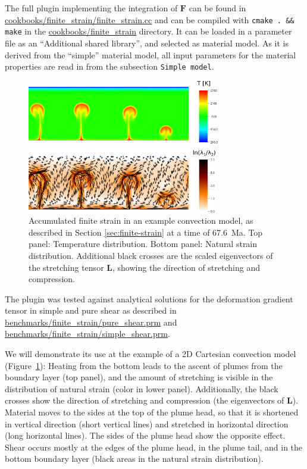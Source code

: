 \documentclass{article}
\begin{document}
The full plugin implementing the integration of $\mathbf F$ can be found in \url{cookbooks/finite_strain/finite_strain.cc} and can be compiled 
with \texttt{cmake . \&\& make} in the \url{cookbooks/finite_strain} directory. 
It can be loaded in a parameter file as an ``Additional shared library'', and selected as material
model. As it is derived from the ``simple'' material model, all input parameters for the material
properties are read in from the subsection \texttt{Simple model}. 


\begin{figure}
    \centering
    \includegraphics[width=0.75\textwidth]{cookbooks/finite_strain/finite_strain.pdf}
    \caption{Accumulated finite strain in an example convection model, as described in Section 
             \ref{sec:finite-strain} at a time of 67.6~Ma. Top panel: Temperature distribution. Bottom panel:
             Natural strain distribution. Additional black crosses are the scaled eigenvectors of the
             stretching tensor $\mathbf L$, showing the direction of stretching and compression.}
    \label{fig:finite_strain}
\end{figure}

The plugin was tested against analytical solutions for the deformation gradient tensor in simple and pure shear as described in \url{benchmarks/finite_strain/pure_shear.prm} and \url{benchmarks/finite_strain/simple_shear.prm}.

We will demonstrate its use at the example of a 2D Cartesian convection model (Figure~\ref{fig:finite_strain}):
Heating from the bottom leads to the ascent of plumes from the boundary layer (top panel), and the
amount of stretching is visible in the distribution of natural strain (color in lower panel).
Additionally, the black crosses show the direction of stretching and compression (the eigenvectors of $\mathbf L$). 
Material moves to the sides at the top of the plume head, so that it is shortened in vertical 
direction (short vertical lines) and stretched in horizontal direction (long horizontal lines). 
The sides of the plume head show the opposite effect. Shear occurs mostly at the 
edges of the plume head, in the plume tail, and in the bottom boundary layer 
(black areas in the natural strain distribution). 
\end{document}
